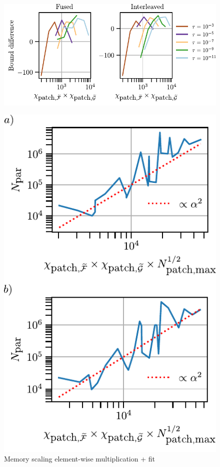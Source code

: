\begin{figure}[htpb]
    \centering
    \includegraphics{figures/elemMulBounds.pdf}
    \caption{}
    \label{fig:elemMulBounds}
\end{figure}

\begin{figure}[htpb]
    \centering
    \includegraphics{figures/elemMulMemoryScaling.pdf}
    \caption{Memory scaling element-wise multiplication + fit  }
\end{figure}




